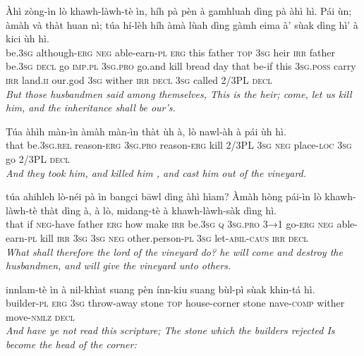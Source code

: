 \documentclass[11pt,a4paper]{article}
\begin{document}
\begin{exe}
\gll Àhì zòng-ìn lò khawh-làwh-tè ìn, híh pà pèn à gamhluah dìng pà àhì hì. Pái ùn; àmàh và thàt huan nì; túa hí-lèh híh àmà lùah dìng gàmh eima à' sùak dìng hì' à kici ùh hì. \\
     be.\textsc{3sg} although-\textsc{erg} \textsc{neg} able-earn-\textsc{pl} \textsc{erg} this father \textsc{top} \textsc{3sg} heir \textsc{irr} father be.\textsc{3sg} \textsc{decl} go \textsc{imp}.\textsc{pl} \textsc{3sg}.\textsc{pro} go.and kill bread day that be-if this \textsc{3sg}.\textsc{poss} carry \textsc{irr} land.\textsc{ii} our.god \textsc{3sg} wither \textsc{irr} \textsc{decl} \textsc{3sg} called 2/3PL \textsc{decl} \\
\glt \textcolor{kjvcolor}{\textit{But those husbandmen said among themselves, This is the heir; come, let us kill him, and the inheritance shall be our's.}}

\gll Túa àhìh màn-ìn àmàh màn-ìn thàt ùh à, lò nawl-àh à pái ùh hì. \\
     that be.\textsc{3sg}.\textsc{rel} reason-\textsc{erg} \textsc{3sg}.\textsc{pro} reason-\textsc{erg} kill 2/3PL \textsc{3sg} \textsc{neg} place-\textsc{loc} \textsc{3sg} go 2/3PL \textsc{decl} \\
\glt \textcolor{kjvcolor}{\textit{And they took him, and killed him , and cast him out of the vineyard.}}

\gll túa ahihleh lò-néi pà ìn bangci bāwl dìng àhì hìam? Àmàh hòng pái-ìn lò khawh-làwh-tè thàt dìng à, à lò, midang-tè à khawh-làwh-sàk dìng hì. \\
     that if \textsc{neg}-have father \textsc{erg} how make \textsc{irr} be.\textsc{3sg} \textsc{q} \textsc{3sg}.\textsc{pro} \textsc{3→1} go-\textsc{erg} \textsc{neg} able-earn-\textsc{pl} kill \textsc{irr} \textsc{3sg} \textsc{3sg} \textsc{neg} other.person-\textsc{pl} \textsc{3sg} let-\textsc{abil}-\textsc{caus} \textsc{irr} \textsc{decl} \\
\glt \textcolor{kjvcolor}{\textit{What shall therefore the lord of the vineyard do? he will come and destroy the husbandmen, and will give the vineyard unto others.}}

\gll innlam-tè ìn à nil-khìat suang pèn ínn-kiu suang bùl-pì sùak khin-tá hì. \\
     builder-\textsc{pl} \textsc{erg} \textsc{3sg} throw-away stone \textsc{top} house-corner stone nave-\textsc{comp} wither move-\textsc{nmlz} \textsc{decl} \\
\glt \textcolor{kjvcolor}{\textit{And have ye not read this scripture; The stone which the builders rejected Is become the head of the corner:}}


\end{exe}
\end{document}
